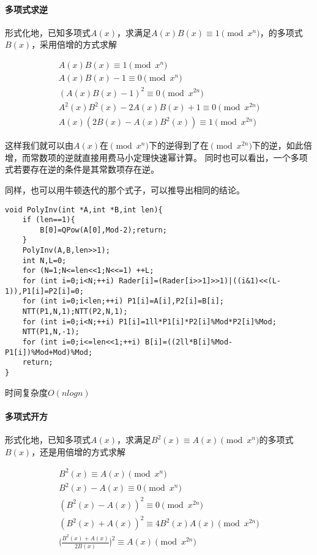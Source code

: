 \documentclass[UTF-8]{ctexart}
\begin{document}
	\paragraph{多项式求逆}形式化地，已知多项式$A(x)$，求满足$A(x)B(x) \equiv 1 \pmod {x^n} $，的多项式$B(x)$，采用倍增的方式求解
	
	\begin{align}
	A(x)B(x) \equiv 1 \pmod{x^n} \nonumber\\ A(x)B(x)-1 \equiv 0 \pmod{x^n} \nonumber\\ (A(x)B(x)-1)^2 \equiv 0 \pmod {x^{2n}} \nonumber\\ A^2(x)B^2(x)-2A(x)B(x)+1 \equiv 0 \pmod{x^{2n}} \nonumber\\ A(x)(2B(x)-A(x)B^2(x)) \equiv 1 \pmod {x^{2n}}\nonumber
	\end{align}
	
	这样我们就可以由$A(x)$在$\pmod{x^n}$下的逆得到了在$\pmod{x^{2n}}$下的逆，如此倍增，而常数项的逆就直接用费马小定理快速幂计算。  
	同时也可以看出，一个多项式若要存在逆的条件是其常数项存在逆。
	
	同样，也可以用牛顿迭代的那个式子，可以推导出相同的结论。
	
\begin{verbatim}
void PolyInv(int *A,int *B,int len){
    if (len==1){
        B[0]=QPow(A[0],Mod-2);return;
    }
    PolyInv(A,B,len>>1);
    int N,L=0;
    for (N=1;N<=len<<1;N<<=1) ++L;
    for (int i=0;i<N;++i) Rader[i]=(Rader[i>>1]>>1)|((i&1)<<(L-1)),P1[i]=P2[i]=0;
    for (int i=0;i<len;++i) P1[i]=A[i],P2[i]=B[i];
    NTT(P1,N,1);NTT(P2,N,1);
    for (int i=0;i<N;++i) P1[i]=1ll*P1[i]*P2[i]%Mod*P2[i]%Mod;
    NTT(P1,N,-1);
    for (int i=0;i<=len<<1;++i) B[i]=((2ll*B[i]%Mod-P1[i])%Mod+Mod)%Mod;
    return;
}
\end{verbatim}
	时间复杂度$O(nlogn)$
	
	\paragraph{多项式开方} 形式化地，已知多项式$A(x)$，求满足$B^2(x) \equiv A(x) \pmod{x^n}$的多项式$B(x)$，还是用倍增的方式求解
	
	\begin{align}
	B^2(x) \equiv A(x) \pmod{x^n} \nonumber\\ B^2(x)-A(x) \equiv 0 \pmod {x^n} \nonumber\\ (B^2(x)-A(x))^2 \equiv 0 \pmod{x^{2n}} \nonumber\\ (B^2(x)+A(x))^2 \equiv 4B^2(x)A(x) \pmod{x^{2n}} \nonumber\\ \lgroup \frac{B^2(x)+A(x)}{2B(x)} \rgroup ^2 \equiv A(x) \pmod{x^{2n}}\nonumber
	\end{align}
	
\end{document}
